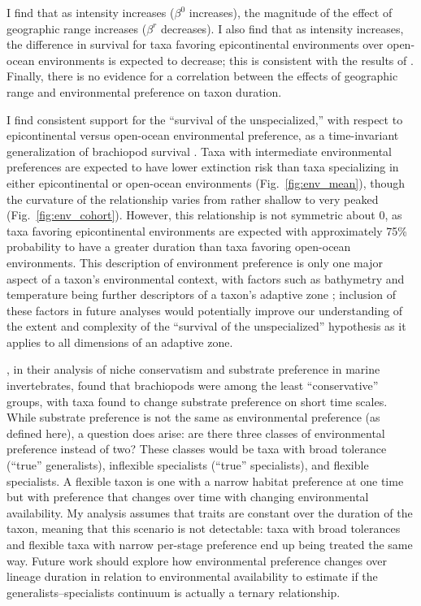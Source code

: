 \documentclass[11pt]{article}
\begin{document}
I find that as intensity increases (\(\beta^{0}\) increases), the magnitude of the effect of geographic range increases (\(\beta^{r}\) decreases). I also find that as intensity increases, the difference in survival for taxa favoring epicontinental environments over open-ocean environments is expected to decrease; this is consistent with the results of \citet{Miller2009a}. Finally, there is no evidence for a correlation between the effects of geographic range and environmental preference on taxon duration. 

I find consistent support for the ``survival of the unspecialized,'' with respect to epicontinental versus open-ocean environmental preference, as a time-invariant generalization of brachiopod survival \citep{Simpson1944}. Taxa with intermediate environmental preferences are expected to have lower extinction risk than taxa specializing in either epicontinental or open-ocean environments (Fig.~\ref{fig:env_mean}), though the curvature of the relationship varies from rather shallow to very peaked (Fig.~\ref{fig:env_cohort}). However, this relationship is not symmetric about 0, as taxa favoring epicontinental environments are expected with approximately 75\% probability to have a greater duration than taxa favoring open-ocean environments. This description of environment preference is only one major aspect of a taxon's environmental context, with factors such as bathymetry and temperature being further descriptors of a taxon's adaptive zone \citep{Nurnberg2013a,Harnik2013,Harnik2011,Heim2011}; inclusion of these factors in future analyses would potentially improve our understanding of the extent and complexity of the ``survival of the unspecialized'' hypothesis as it applies to all dimensions of an adaptive zone.

\citet{Hopkins2014a}, in their analysis of niche conservatism and substrate preference in marine invertebrates, found that brachiopods were among the least ``conservative'' groups, with taxa found to change substrate preference on short time scales. While substrate preference is not the same as environmental preference (as defined here), a question does arise: are there three classes of environmental preference instead of two? These classes would be taxa with broad tolerance (``true'' generalists), inflexible specialists (``true'' specialists), and flexible specialists. A flexible taxon is one with a narrow habitat preference at one time but with preference that changes over time with changing environmental availability. My analysis assumes that traits are constant over the duration of the taxon, meaning that this scenario is not detectable: taxa with broad tolerances and flexible taxa with narrow per-stage preference end up being treated the same way. Future work should explore how environmental preference changes over lineage duration in relation to environmental availability to estimate if the generalists--specialists continuum is actually a ternary relationship.
\end{document}
